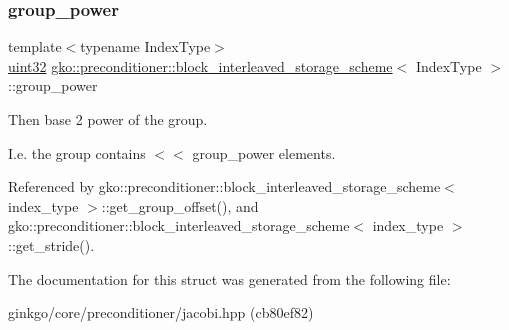 \subsubsection{\texorpdfstring{group\+\_\+power}{group\_power}}
{\footnotesize\ttfamily template$<$typename Index\+Type$>$ \\
\hyperlink{namespacegko_a318c831e3fe269ba04c6ed8bf5a71073}{uint32} \hyperlink{structgko_1_1preconditioner_1_1block__interleaved__storage__scheme}{gko\+::preconditioner\+::block\+\_\+interleaved\+\_\+storage\+\_\+scheme}$<$ Index\+Type $>$\+::group\+\_\+power}



Then base 2 power of the group. 

I.\+e. the group contains { $<$$<$ group\+\_\+power} elements. 

Referenced by gko\+::preconditioner\+::block\+\_\+interleaved\+\_\+storage\+\_\+scheme$<$ index\+\_\+type $>$\+::get\+\_\+group\+\_\+offset(), and gko\+::preconditioner\+::block\+\_\+interleaved\+\_\+storage\+\_\+scheme$<$ index\+\_\+type $>$\+::get\+\_\+stride().



The documentation for this struct was generated from the following file\+:\begin{DoxyCompactItemize}
\item 
ginkgo/core/preconditioner/jacobi.\+hpp (cb80ef82)\end{DoxyCompactItemize}
